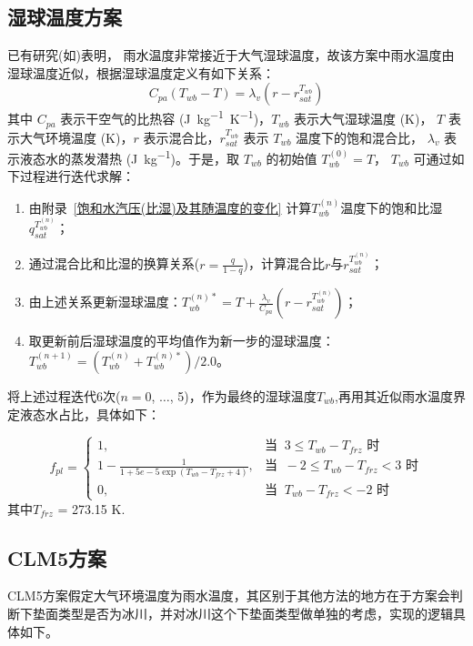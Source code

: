 \subsection{湿球温度方案}
已有研究(如\citet{anderson1998moored})表明，
雨水温度非常接近于大气湿球温度，故该方案中雨水温度由湿球温度近似，根据湿球温度定义有如下关系：
\begin{equation}
C_{p a}\left(T_{w b}-T\right)=\lambda_{v}\left(r-r_{s a t}^{T_{w b}}\right)
\end{equation}
其中 $C_{pa}$ 表示干空气的比热容 (\unit{J.kg^{-1}.K^{-1}})，$T_{wb}$ 表示大气湿球温度 (K)，
$T$ 表示大气环境温度 (K)，$r$ 表示混合比，$r_{sat}^{T_{wb}}$ 表示 $T_{wb}$ 温度下的饱和混合比，
$\lambda_v$ 表示液态水的蒸发潜热 (\unit{J.kg^{-1}})。于是，取 $T_{wb}$ 的初始值 $T_{wb}^{\left(0\right)}=T$，
$T_{wb}$ 可通过如下过程进行迭代求解：
\begin{enumerate}
    \item 由附录~\ref{饱和水汽压(比湿)及其随温度的变化} 计算$T_{wb}^{\left(n\right)}$温度下的饱和比湿$q_{sat}^{T_{wb}^{\left(n\right)}}$；
    \item 通过混合比和比湿的换算关系($r=\frac{q}{1-q}$)，计算混合比$r$与$r_{sat}^{T_{wb}^{\left(n\right)}}$；
    \item 由上述关系更新湿球温度：$T_{wb}^{\left(n\right)\ast}=T+\frac{\lambda_v}{C_{pa}}\left(r-r_{sat}^{T_{wb}^{\left(n\right)}}\right)$；
    \item 取更新前后湿球温度的平均值作为新一步的湿球温度：$T_{wb}^{\left(n+1\right)}=\left(T_{wb}^{\left(n\right)}+T_{wb}^{\left(n\right)\ast}\right)/2.0$。
\end{enumerate}
将上述过程迭代6次($n=0$, $\ldots$, 5)，作为最终的湿球温度$T_{wb}$,再用其近似雨水温度界定液态水占比，具体如下：

\begin{equation}
f_{pl}= \begin{cases}
1, & \text{当 }\ 3\le T_{wb} - T_{frz} \text{ 时} \\
1 - \frac{1}{1 + 5e-5\exp{(T_{wb} - T_{frz}+4)}} , & \text{当 }\ -2\le T_{wb} - T_{frz} < 3 \text{ 时} \\
0, & \text{当 }\ T_{wb} - T_{frz} < -2 \text{ 时}
\end{cases}
\end{equation}
%
其中$T_{frz}$ = 273.15 K.


\subsection{CLM5方案}
CLM5方案假定大气环境温度为雨水温度，其区别于其他方法的地方在于方案会判断下垫面类型是否为冰川，并对冰川这个下垫面类型做单独的考虑，实现的逻辑具体如下。

